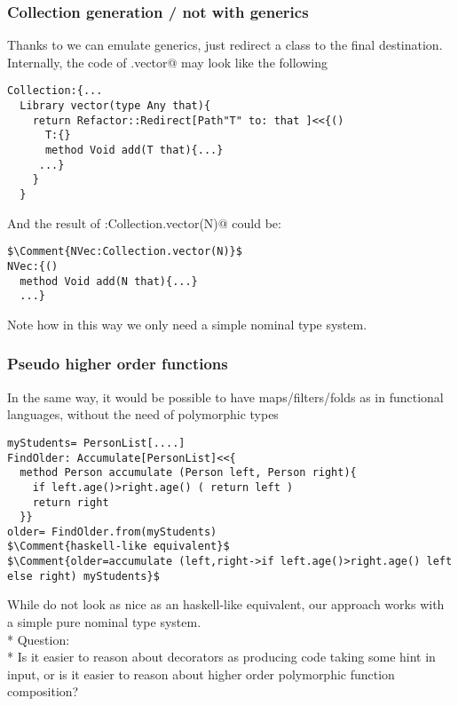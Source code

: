 \begin{frame}[fragile]
\frametitle{Collection generation / not with generics}
Thanks to \Q@Adapt@ we can emulate generics, just redirect a class to the final destination.
Internally, the code of \Q@Collection.vector@ may look like the following
\begin{NiceCode}{59ex}{0.8}
\begin{lstlisting}
Collection:{...
  Library vector(type Any that){
    return Refactor::Redirect[Path"T" to: that ]<<{()
      T:{}
      method Void add(T that){...}
     ...}
    }
  }
\end{lstlisting}
\end{NiceCode}
And the result of \Q@NVec:Collection.vector(N)@ could be:
\begin{NiceCode}{59ex}{0.8}
\begin{lstlisting}
$\Comment{NVec:Collection.vector(N)}$
NVec:{()
  method Void add(N that){...}
  ...}
\end{lstlisting}
\end{NiceCode}


Note how in this way we only need a simple nominal type system.
\end{frame}


\begin{frame}[fragile]
\frametitle{Pseudo higher order functions}
In the same way, it would be possible to have maps/filters/folds as in functional languages, without the need of polymorphic types
\begin{NiceCode}{59ex}{0.8}
\begin{lstlisting}
myStudents= PersonList[....]
FindOlder: Accumulate[PersonList]<<{
  method Person accumulate (Person left, Person right){
    if left.age()>right.age() ( return left )
    return right
  }}
older= FindOlder.from(myStudents)
$\Comment{haskell-like equivalent}$
$\Comment{older=accumulate (left,right->if left.age()>right.age() left else right) myStudents}$
\end{lstlisting}
\end{NiceCode}
While do not look as nice as an haskell-like equivalent,
our approach works with a simple pure nominal type system.
\\*
\PresentationOnly\pause
\alert{Question:}
\\*
Is it easier to reason about decorators as producing code taking some hint in input, or
is it easier to reason about higher order polymorphic function composition?
\end{frame}


